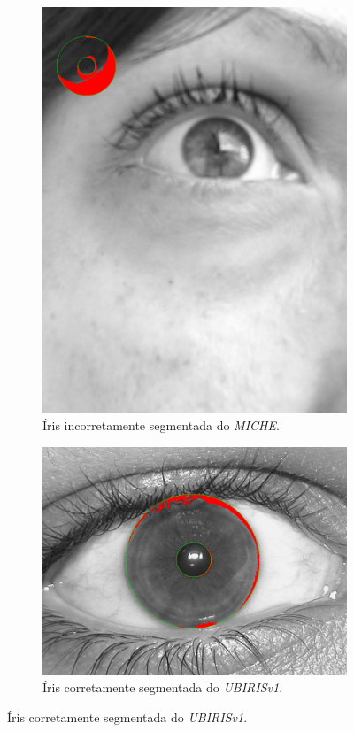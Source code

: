 \begin{figure}[H]
\begin{subfigure}{0.25\textwidth}
  \includegraphics[width=\linewidth]{img/Resultados/miche/miche_seg_ruim.jpg}
  \caption{Íris incorretamente segmentada do \textit{MICHE}.}
\end{subfigure}\hfil %
\begin{subfigure}{0.25\textwidth}
  \includegraphics[width=\linewidth]{img/Resultados/ubirisv1/ubirisv1_seg_boa.jpg}
  \caption{Íris corretamente segmentada do \textit{UBIRISv1}.}
\end{subfigure}


\end{figure}
